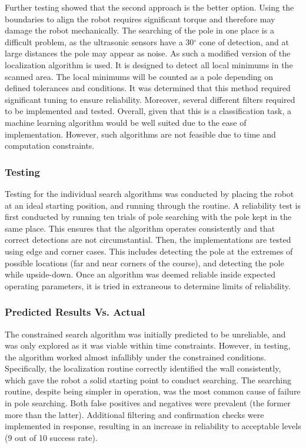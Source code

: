 \documentclass[ece]{uw-wkrpt}
\begin{document}
Further testing showed that the second approach is the better option. Using the boundaries to align the robot requires significant torque and therefore may damage the robot mechanically. The searching of the pole in one place is a difficult problem, as the ultrasonic sensors have a 30$^{\circ}$ cone of detection, and at large distances the pole may appear as noise. As such a modified version of the localization algorithm is used. It is designed to detect all local minimums in the scanned area. The local minimums will be counted as a pole depending on defined tolerances and conditions. It was determined that this method required significant tuning to ensure reliability. Moreover, several different filters required to be implemented and tested. Overall, given that this is a classification task, a machine learning algorithm would be well suited due to the ease of implementation. However, such algorithms are not feasible due to time and computation constraints.

\subsubsection{Testing}

Testing for the individual search algorithms was conducted by placing the robot at an ideal starting position, and running through the routine. A reliability test is first conducted by running ten trials of pole searching with the pole kept in the same place. This ensures that the algorithm operates consistently and that correct detections are not circumstantial. Then, the implementations are tested using edge and corner cases. This includes detecting the pole at the extremes of possible locations (far and near corners of the course), and detecting the pole while upside-down. Once an algorithm was deemed reliable inside expected operating parameters, it is tried in extraneous to determine limits of reliability. 

\subsubsection{Predicted Results Vs. Actual}

The constrained search algorithm was initially predicted to be unreliable, and was only explored as it was viable within time constraints. However, in testing, the algorithm worked almost infallibly under the constrained conditions. Specifically, the localization routine correctly identified the wall consistently, which gave the robot a solid starting point to conduct searching. The searching routine, despite being simpler in operation, was the most common cause of failure in pole searching. Both false positives and negatives were prevalent (the former more than the latter). Additional filtering and confirmation checks were implemented in response, resulting in an increase in reliability to acceptable levels (9 out of 10 success rate). 
\end{document}
